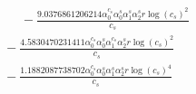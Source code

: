 \documentclass[10pt]{article}
\begin{document}
\begin{align*}
\phantom{R_{0,8}} &\phantom{={}}{}  - \frac{9.0376861206214 \alpha_{0}^{c_s} \alpha_{0}^s \alpha_{1}^s \alpha_{2}^s r \log{\left(c_{s} \right)}^{2}}{c_{s}} \\
&{}  - \frac{4.5830470231411 \alpha_{0}^{c_s} \alpha_{0}^s \alpha_{1}^{c_s} \alpha_{2}^s r \log{\left(c_{s} \right)}^{2}}{c_{s}} \\
&{}  - \frac{1.1882087738702 \alpha_{0}^{c_s} \alpha_{0}^s \alpha_{1}^s \alpha_{2}^s r \log{\left(c_{s} \right)}^{4}}{c_{s}}
\end{align*}
\end{document}
